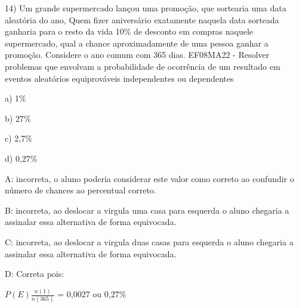 14) Um grande supermercado lançou uma promoção, que sortearia uma data
aleatória do ano, Quem fizer aniversário exatamente naquela data
sorteada ganharia para o resto da vida 10\% de desconto em compras
naquele supermercado, qual a chance aproximadamente de uma pessoa ganhar
a promoção. Considere o ano comum com 365 dias. EF08MA22 - Resolver
problemas que envolvam a probabilidade de ocorrência de um resultado em
eventos aleatórios equiprováveis independentes ou dependentes

a) 1\%

b) 27\%

c) 2,7\%

d) 0,27\%

A: incorreta, o aluno poderia considerar este valor como correto ao
confundir o número de chances ao percentual correto.

B: incorreta, ao deslocar a virgula uma casa para esquerda o aluno
chegaria a assinalar essa alternativa de forma equivocada.

C: incorreta, ao deslocar a virgula duas casas para esquerda o aluno
chegaria a assinalar essa alternativa de forma equivocada.

D: Correta pois:

\(P(E)\frac{n(1)}{n(365)}\) = 0,0027 ou 0,27\%
